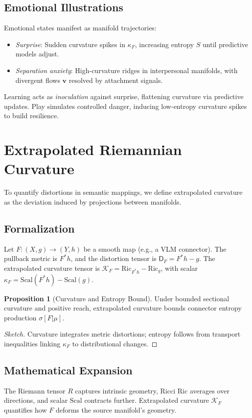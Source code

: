 \documentclass{article}
\theoremstyle{definition}
\newtheorem{proposition}[theorem]{Proposition}
\begin{document}
\subsection{Emotional Illustrations}
Emotional states manifest as manifold trajectories:
\begin{itemize}
  \item \emph{Surprise}: Sudden curvature spikes in $\kappa_F$, increasing entropy $S$ until predictive models adjust.
  \item \emph{Separation anxiety}: High-curvature ridges in interpersonal manifolds, with divergent flows $\mathbf{v}$ resolved by attachment signals.
\end{itemize}
Learning acts as \emph{inoculation} against surprise, flattening curvature via predictive updates. Play simulates controlled danger, inducing low-entropy curvature spikes to build resilience.

\section{Extrapolated Riemannian Curvature}
To quantify distortions in semantic mappings, we define extrapolated curvature as the deviation induced by projections between manifolds.

\subsection{Formalization}
Let $F: (X, g) \to (Y, h)$ be a smooth map (e.g., a VLM connector). The pullback metric is $F^* h$, and the distortion tensor is $\mathsf{D}_F = F^* h - g$. The extrapolated curvature tensor is $\mathcal{K}_F = \mathrm{Ric}_{F^* h} - \mathrm{Ric}_g$, with scalar $\kappa_F = \mathrm{Scal}(F^* h) - \mathrm{Scal}(g)$.

\begin{proposition}[Curvature and Entropy Bound]
Under bounded sectional curvature and positive reach, extrapolated curvature bounds connector entropy production $\sigma[F|\mu]$.
\end{proposition}

\begin{proof}[Sketch]
Curvature integrates metric distortions; entropy follows from transport inequalities linking $\kappa_F$ to distributional changes.
\end{proof}

\subsection{Mathematical Expansion}
The Riemann tensor $R$ captures intrinsic geometry, Ricci $\mathrm{Ric}$ averages over directions, and scalar $\mathrm{Scal}$ contracts further. Extrapolated curvature $\mathcal{K}_F$ quantifies how $F$ deforms the source manifold’s geometry.
\end{document}
